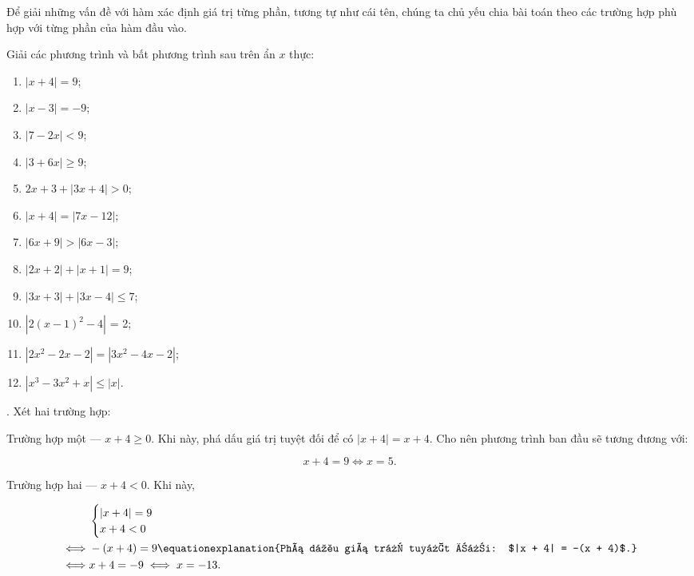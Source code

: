 Để giải những vấn đề với hàm xác định giá trị từng phần, tương tự như cái tên, chúng ta chủ yếu chia bài toán theo các trường hợp phù hợp với từng phần của hàm đầu vào.

\exercise Giải các phương trình và bất phương trình sau trên ẩn $x$ thực:

\begin{multicols}{2}
   \begin{enumerate}
      \item $|x + 4| = 9$;
      \item $|x - 3| = -9$;
      \item $|7 - 2x| < 9$;
      \item $|3 + 6x| \geq 9$;
      \item $2x + 3 + |3x + 4| > 0$;
      \item $|x + 4| = |7x - 12|$;
      \item $|6x + 9| > |6x - 3|$;
      \item $\left|2x + 2\right| + |x + 1| = 9$;
      \item $|3x + 3| + |3x - 4| \leq 7$;
      \item $\left|2(x - 1)^2 - 4\right|$ = 2;
      \item $\left|2x^2 - 2x - 2\right| = \left|3x^2 - 4x - 2\right|$;
      \item $\left|x^3 - 3x^2 + x\right| \leq |x|$.
   \end{enumerate}
\end{multicols}

\solution

\setcounter{subexercise}{1}
. Xét hai trường hợp:

\textcolor{colorEmphasisCyan}{Trường hợp một --- $x + 4 \geq 0$}. Khi này, phá dấu giá trị tuyệt đối để có $|x + 4| = x + 4$. Cho nên phương trình ban đầu sẽ tương đương với:

\begin{equation*}
   x + 4 = 9 \iff x = 5.
\end{equation*}

\textcolor{colorEmphasis}{Trường hợp hai --- $x + 4 < 0$}. Khi này,

\begin{align*}
   &\begin{cases}
      |x + 4| = 9 \\
      x + 4 < 0
   \end{cases} \\
   \iff &-(x + 4) = 9 \equationexplanation{Phá dấu giá trị tuyệt đối: $|x + 4| = -(x + 4)$.}\\
   \iff &x + 4 = -9 \iff x = -13.
\end{align*}

